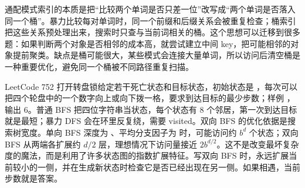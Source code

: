 通配模式索引的本质是把“比较两个单词是否只差一位”改写成“两个单词是否落入同一个桶”。暴力比较每对单词时，同一个前缀和后缀关系会被重复检查；桶索引把这些关系预处理出来，搜索时只查与当前词相关的桶。这个思想可以迁移到很多题：如果判断两个对象是否相邻的成本高，就尝试建立中间 key，把可能相邻的对象提前聚类。缺点是桶可能很大，某些模式会连接大量单词，所以访问后清空桶是一种重要优化，避免同一个桶被不同路径重复扫描。

LeetCode 752 打开转盘锁给定若干死亡状态和目标状态，初始状态是 ，每次可以把四个轮盘中的一个数字向上或向下拨一格，要求到达目标的最少步数；样例 ，输出 6。普通 BFS 把四位字符串当状态，每个状态有 8 个邻居，第一次到达目标就是最短；暴力 DFS 会在环里反复绕，需要 visited。双向 BFS 的优化依据是搜索树宽度。单向 BFS 深度为 、平均分支因子为  时，可能访问约 \ensuremath{b^d} 个状态；双向 BFS 从两端各扩展约 \ensuremath{d/2} 层，理想情况下访问量接近 \ensuremath{2b^{d/2}}。这不是改变最坏复杂度的魔法，而是利用了许多状态图的指数扩展特征。写双向 BFS 时，永远扩展当前较小的一侧，并在生成新状态时检查它是否已经出现在另一侧。如果相遇，当前步数就是答案。


